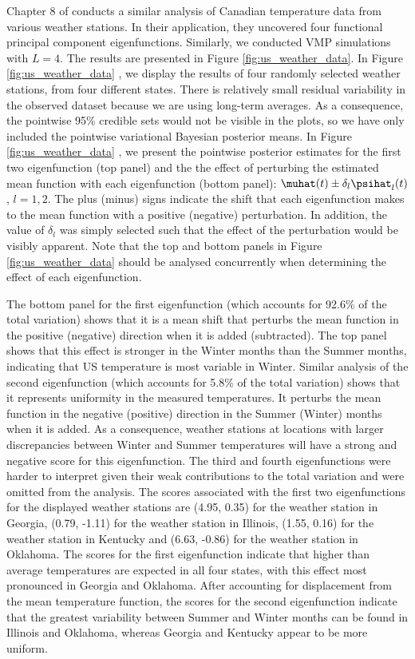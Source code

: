 \documentclass[12pt]{article}
\theoremstyle{plain}
\theoremstyle{definition}
\theoremstyle{remark}
\begin{document}
Chapter 8 of  conducts a similar analysis of Canadian temperature data from various weather
stations. In their application, they uncovered four functional principal component eigenfunctions.
Similarly, we conducted VMP simulations with $L = 4$.
The results are presented in Figure \ref{fig:us_weather_data}. In Figure \ref{fig:us_weather_data}
, we display the results of four randomly selected weather stations, from four different
states. There is relatively small residual variability in the observed dataset because we are using long-term averages.
As a consequence, the pointwise 95\% credible sets would not be visible in the plots,
so we have only included the pointwise variational Bayesian posterior means.
In Figure \ref{fig:us_weather_data} , we present the pointwise posterior estimates
for the first two eigenfunction (top panel) and the
the effect of perturbing the estimated mean function with each eigenfunction (bottom panel):
$\muhat (t) \pm \delta_l \psihat_l (t)$,
$l = 1, 2$. The plus (minus) signs indicate the shift that each eigenfunction makes to the mean function
with a positive (negative) perturbation. In addition, the value of $\delta_l$ was simply selected such that the effect
of the perturbation would be visibly apparent. Note that the top and bottom panels in Figure
\ref{fig:us_weather_data}  should be analysed concurrently when determining
the effect of each eigenfunction.

The bottom panel for the first eigenfunction (which accounts for 92.6\% of the total variation)
shows that it is a mean shift that perturbs the mean function in the positive
(negative) direction when it is added (subtracted). The top panel shows that this effect is stronger in the Winter months
than the Summer months, indicating that US temperature is most variable in Winter. Similar analysis of the
second eigenfunction (which accounts for 5.8\% of the total variation) shows that it represents uniformity in the measured
temperatures. It perturbs the mean function in the negative (positive) direction in the Summer (Winter) months when
it is added. As a consequence, weather stations at locations with larger discrepancies
between Winter and Summer temperatures will have a strong and negative score for this eigenfunction.
The third and fourth eigenfunctions were harder to interpret given their weak contributions to the
total variation and were omitted from the analysis.
The scores associated with the first two eigenfunctions for the displayed weather stations are
(4.95, 0.35) for the weather station in Georgia, (0.79, -1.11) for the weather station in Illinois, (1.55, 0.16)
for the weather station in Kentucky and (6.63, -0.86) for the weather station in Oklahoma.
The scores for the first eigenfunction indicate that higher than average temperatures are expected
in all four states, with this effect most pronounced in Georgia and Oklahoma.
After accounting for displacement from the mean temperature function, 
the scores for the second eigenfunction indicate that the
greatest variability between Summer and Winter months can be found
in Illinois and Oklahoma, whereas Georgia and Kentucky
appear to be more uniform.
\end{document}
